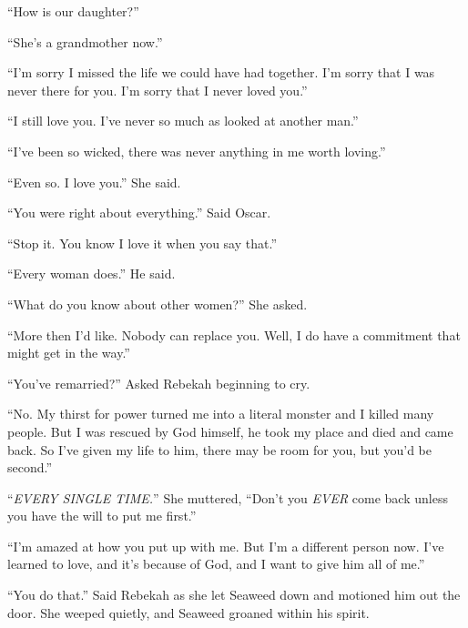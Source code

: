 ``How is our daughter?''

``She's a grandmother now.''

``I'm sorry I missed the life we could have had together. I'm sorry that I was never there for you. I'm sorry that I never loved you.''

``I still love you. I've never so much as looked at another man.''

``I've been so wicked, there was never anything in me worth loving.''

``Even so. I love you.'' She said.

``You were right about everything.'' Said Oscar.

``Stop it. You know I love it when you say that.''

``Every woman does.'' He said.

``What do you know about other women?'' She asked.

``More then I'd like. Nobody can replace you. Well, I do have a commitment that might get in the way.''

``You've remarried?'' Asked Rebekah beginning to cry.

``No. My thirst for power turned me into a literal monster and I killed many people. But I was rescued by God himself, he took my place and died and came back. So I've given my life to him, there may be room for you, but you'd be second.''

``\emph{EVERY SINGLE TIME.}'' She muttered, ``Don't you \emph{EVER} come back unless you have the will to put me first.''

``I'm amazed at how you put up with me. But I'm a different person now. I've learned to love, and it's because of God, and I want to give him all of me.''

``You do that.'' Said Rebekah as she let Seaweed down and motioned him out the door. She weeped quietly, and Seaweed groaned within his spirit.


